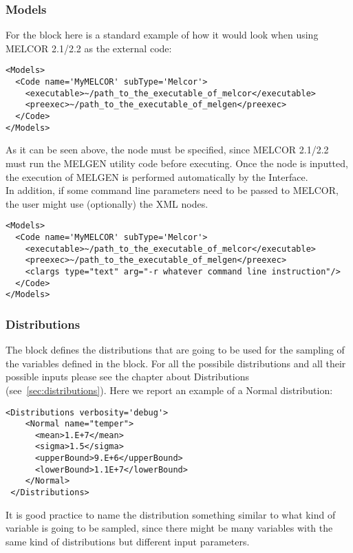 \subsubsection{Models}
For the  block here is a standard example of how it would look
when using MELCOR 2.1/2.2 as the external code:
\begin{lstlisting}[style=XML]
<Models>
  <Code name='MyMELCOR' subType='Melcor'>
    <executable>~/path_to_the_executable_of_melcor</executable>
    <preexec>~/path_to_the_executable_of_melgen</preexec>
  </Code>
</Models>
\end{lstlisting}
As it can be seen above, the  node must be specified, since MELCOR 2.1/2.2 must run the MELGEN utility
code before executing. Once the  node is inputted, the execution of MELGEN is performed automatically by the Interface.
\\In addition, if some command line parameters need to be passed to MELCOR, the user might use (optionally) the  XML nodes.
\begin{lstlisting}[style=XML]
<Models>
  <Code name='MyMELCOR' subType='Melcor'>
    <executable>~/path_to_the_executable_of_melcor</executable>
    <preexec>~/path_to_the_executable_of_melgen</preexec>
    <clargs type="text" arg="-r whatever command line instruction"/>
  </Code>
</Models>
\end{lstlisting}

\subsubsection{Distributions}
The  block defines the distributions that are going
to be used for the sampling of the variables defined in the 
block.
%
For all the possibile distributions and all their possible inputs please see the
chapter about Distributions (see~\ref{sec:distributions}).
%
Here we report an example of a Normal distribution:
\begin{lstlisting}[style=XML,morekeywords={name,debug}]
<Distributions verbosity='debug'>
    <Normal name="temper">
      <mean>1.E+7</mean>
      <sigma>1.5</sigma>
      <upperBound>9.E+6</upperBound>
      <lowerBound>1.1E+7</lowerBound>
    </Normal>
 </Distributions>
\end{lstlisting}

It is good practice to name the distribution something similar to what kind of
variable is going to be sampled, since there might be many variables with the
same kind of distributions but different input parameters.
%
